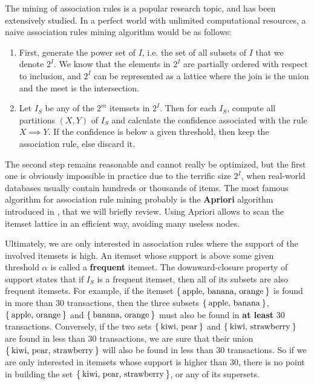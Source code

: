The mining of association rules is a popular research topic, and has been
extensively studied. In a perfect world with unlimited computational resources,
a naive association rules mining algorithm would be as follows:
\begin{enumerate}
\item First, generate the power set of $I$, i.e. the set of all subsets of $I$
  that we denote $2^I$.  We know that the elements in $2^I$ are partially
  ordered with respect to inclusion, and $2^I$ can be represented as a lattice
  where the join is the union and the meet is the intersection.
\item Let $I_S$ be any of the $2^m$ itemsets in $2^I$. Then for each $I_S$,
  compute all partitions $(X, Y)$ of $I_S$ and calculate the confidence
    associated with the rule $X \implies Y$. If the confidence is below a given
    threshold, then keep the association rule, else discard it.
\end{enumerate}

The second step remains reasonable and cannot really be optimized, but the
first one is obviously impossible in practice due to the terrific size $2^I$,
when real-world databases usually contain hundreds or thousands of items.
The most famous algorithm for association rule mining probably is the
\textbf{Apriori} algorithm introduced in \cite{AgrSriVLDB94}, that we will
briefly review. Using Apriori allows to scan the itemset lattice in an
efficient way, avoiding many useless nodes.

Ultimately, we are only interested in association rules where the support of
the involved itemsets is high. An itemset whose support is above some given
threshold $\alpha$ is called a \textbf{frequent} itemset. The downward-closure
property of support states that if $I_S$ is a frequent itemset, then all of its
subsets are also frequent itemsets. For example, if the itemset
$\Set{\text{apple, banana, orange}}$ is found in more than 30 transactions,
then the three subsets $\Set{\text{apple, banana}}$, $\Set{\text{apple,
orange}}$ and $\Set{\text{banana, orange}}$ must also be found in \textbf{at
least} 30 transactions. Conversely, if the two sets $\Set{\text{kiwi, pear}}$ and
$\Set{\text{kiwi, strawberry}}$ are found in less than $30$ transactions, we
are sure that their union $\Set{\text{kiwi, pear, strawberry}}$ will also be
found in less than $30$ transactions. So if we are only interested in itemsets
whose support is higher than $30$, there is no point in building the set
$\Set{\text{kiwi, pear, strawberry}}$, or any of its supersets.

